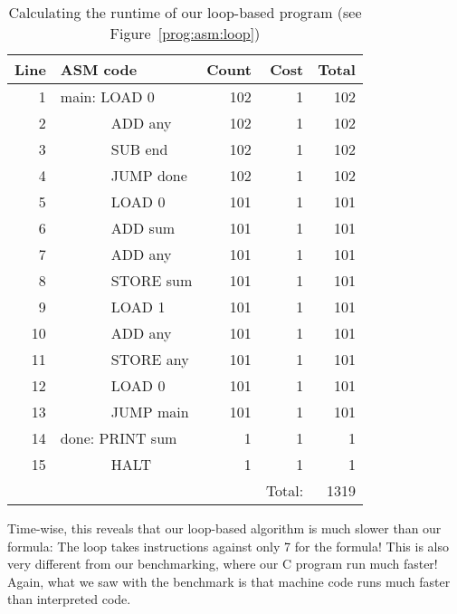 \documentclass{aldast}
\begin{document}
\begin{table}[htbp]
  \begin{center}
    \begin{tabular}{>{\scriptsize}r>{\ttfamily}lrrr}
      \toprule
      Line & ASM code         & Count & Cost   & Total \\
      \midrule
      1    & main: LOAD 0     & 102   & 1      & 102   \\
      2    & ~~~~~~~ADD any   & 102   & 1      & 102   \\
      3    & ~~~~~~~SUB end   & 102   & 1      & 102   \\
      4    & ~~~~~~~JUMP done & 102   & 1      & 102   \\[5pt]
      5    & ~~~~~~~LOAD 0    & 101   & 1      & 101   \\
      6    & ~~~~~~~ADD sum   & 101   & 1      & 101   \\
      7    & ~~~~~~~ADD any   & 101   & 1      & 101   \\
      8    & ~~~~~~~STORE sum & 101   & 1      & 101   \\
      9    & ~~~~~~~LOAD 1    & 101   & 1      & 101   \\ 
      10   & ~~~~~~~ADD any   & 101   & 1      & 101   \\ 
      11   & ~~~~~~~STORE any & 101   & 1      & 101   \\ 
      12   & ~~~~~~~LOAD 0    & 101   & 1      & 101   \\ 
      13   & ~~~~~~~JUMP main & 101   & 1      & 101   \\[5pt] 
      14   & done: PRINT sum  & 1     & 1      & 1     \\ 
      15   & ~~~~~~~HALT      & 1     & 1      & 1     \\ 
      \midrule
           &                  &       & Total: & 1319  \\
      \bottomrule
    \end{tabular}
  \end{center}
  \caption{Calculating the runtime of our loop-based program (see Figure~\ref{prog:asm:loop})}
  \label{tab:breakdown}
\end{table}

Time-wise, this reveals that our loop-based algorithm is much slower
than our formula: The loop takes  instructions against
only 7 for the formula! This is also very different from our
benchmarking, where our C program run much faster! Again, what we saw
with the benchmark is that machine code runs much faster than
interpreted code.
\end{document}
